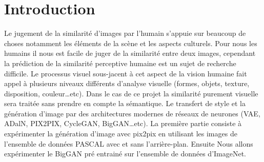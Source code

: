 \chapter{Introduction}

Le jugement de la similarité d'images par l'humain s'appuie sur beaucoup de choses notamment les éléments de la scène et les aspects culturels. Pour nous les humains il nous est facile de juger de la similarité entre deux images, cependant la prédiction de la similarité perceptive humaine est un sujet de recherche difficile. Le processus visuel sous-jacent à cet aspect de la vision humaine fait appel à plusieurs niveaux différents d'analyse visuelle (formes, objets, texture, disposition, couleur…etc). Dans le cas de ce projet la similarité purement visuelle sera traitée sans prendre en compte la sémantique. Le transfert de style et la génération d'image par des architectures modernes de réseaux de neurones (VAE, ADalN, PIX2PIX, CycleGAN, BigGAN…etc). La première partie consiste à expérimenter la génération d'image avec pix2pix en utilisant les images de l'ensemble de données PASCAL avec et sans l'arrière-plan. Ensuite Nous allons expérimenter le BigGAN pré entrainé sur l'ensemble de données d'ImageNet.